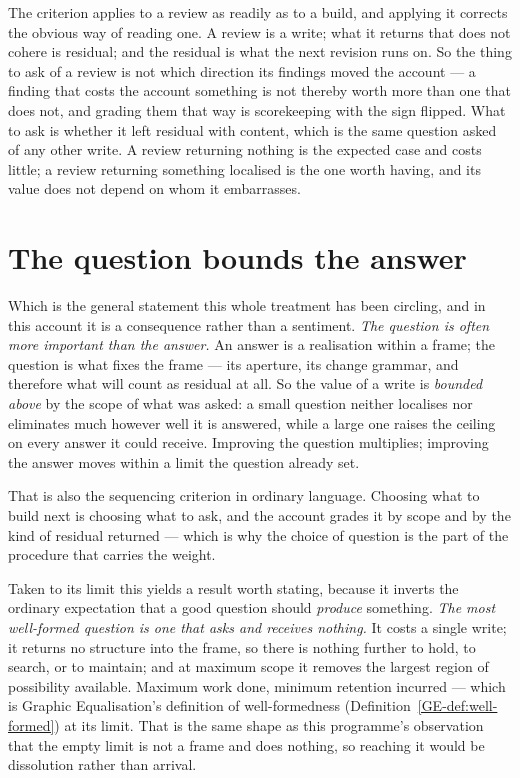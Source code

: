\documentclass[11pt,a4paper]{article}
\begin{document}
The criterion applies to a review as readily as to a build, and applying it corrects the obvious way of
reading one. A review is a write; what it returns that does not cohere is residual; and the residual is
what the next revision runs on. So the thing to ask of a review is not which direction its findings
moved the account --- a finding that costs the account something is not thereby worth more than one
that does not, and grading them that way is scorekeeping with the sign flipped. What to ask is whether
it left residual with content, which is the same question asked of any other write. A review returning
nothing is the expected case and costs little; a review returning something localised is the one worth
having, and its value does not depend on whom it embarrasses.

\section{The question bounds the answer}\label{sec:question}

Which is the general statement this whole treatment has been circling, and in this account it is a
consequence rather than a sentiment. \emph{The question is often more important than the answer.} An
answer is a realisation within a frame; the question is what fixes the frame --- its aperture, its
change grammar, and therefore what will count as residual at all. So the value of a write is
\emph{bounded above} by the scope of what was asked: a small question neither localises nor eliminates
much however well it is answered, while a large one raises the ceiling on every answer it could
receive. Improving the question multiplies; improving the answer moves within a limit the question
already set.

That is also the sequencing criterion in ordinary language. Choosing what to build next is choosing
what to ask, and the account grades it by scope and by the kind of residual returned --- which is why
the choice of question is the part of the procedure that carries the weight.

Taken to its limit this yields a result worth stating, because it inverts the ordinary expectation
that a good question should \emph{produce} something. \emph{The most well-formed question is one that
asks and receives nothing.} It costs a single write; it returns no structure into the frame, so there
is nothing further to hold, to search, or to maintain; and at maximum scope it removes the largest
region of possibility available. Maximum work done, minimum retention incurred --- which is
Graphic Equalisation's definition of well-formedness (Definition~\ref{GE-def:well-formed}) at its
limit. That is the same shape as this programme's observation that
the empty limit is not a frame and does nothing, so reaching it would be dissolution rather than arrival.
\end{document}
